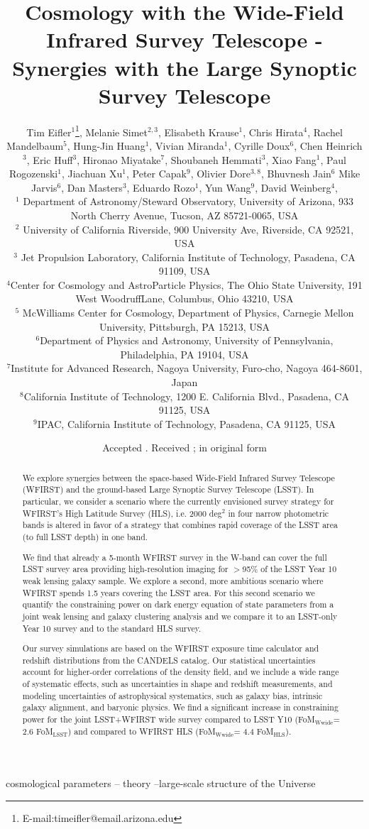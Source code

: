 \documentclass[fleqn,usenatbib,useAMS]{mnras}
\title[Cosmology with WFIRST - Synergies with LSST]{Cosmology with the Wide-Field Infrared Survey Telescope - Synergies with the Large Synoptic Survey Telescope}
\author[Tim Eifler et al.]{Tim Eifler$^{1}$\thanks{E-mail:timeifler@email.arizona.edu}, 
Melanie Simet$^{2,3}$,
Elisabeth Krause$^{1}$,
Chris Hirata$^{4}$, 
Rachel Mandelbaum$^{5}$, 
\newauthor
Hung-Jin Huang$^{1}$,
Vivian Miranda$^{1}$,
Cyrille Doux$^{6}$,
Chen Heinrich$^{3}$,
Eric Huff$^{3}$,
\newauthor
Hironao Miyatake$^{7}$,
Shoubaneh Hemmati$^{3}$, 
Xiao Fang$^{1}$,
Paul Rogozenski$^{1}$, 
Jiachuan Xu$^{1}$, 
\newauthor 
Peter Capak$^{9}$,
Olivier Dore$^{3,8}$,
Bhuvnesh Jain$^{6}$
Mike Jarvis$^{6}$,
Dan Masters$^{3}$, 
\newauthor
Eduardo Rozo$^{1}$, 
Yun Wang$^{9}$,
David Weinberg$^{4}$, 
\\
$^{1}$ Department of Astronomy/Steward Observatory, University of Arizona, 933 North Cherry Avenue, Tucson, AZ 85721-0065, USA \\
$^{2}$ University of California Riverside, 900 University Ave, Riverside, CA 92521, USA \\
$^{3}$ Jet Propulsion Laboratory, California Institute of Technology, Pasadena, CA 91109, USA\\
$^{4}$Center for Cosmology and AstroParticle Physics, The Ohio State University, 191 West WoodruffLane, Columbus, Ohio 43210, USA\\
$^{5}$ McWilliams Center for Cosmology, Department of Physics, Carnegie Mellon University, Pittsburgh, PA 15213, USA \\
$^{6}$Department of Physics and Astronomy, University of Pennsylvania, Philadelphia, PA 19104, USA \\
$^{7}$Institute for Advanced Research, Nagoya University, Furo-cho, Nagoya 464-8601, Japan \\
$^{8}$California Institute of Technology, 1200 E. California Blvd., Pasadena, CA 91125, USA\\
$^{9}$IPAC, California Institute of Technology, Pasadena, CA 91125, USA
}
\newcommand{\mr}{\mathrm}
\begin{document}
\date{Accepted . Received ; in original form }

\pagerange{\pageref{firstpage}--\pageref{lastpage}} 

\maketitle

\label{firstpage}

\begin{abstract} 
We explore synergies between the space-based Wide-Field Infrared Survey Telescope (WFIRST) and the ground-based Large Synoptic Survey Telescope (LSST). In particular, we consider a scenario where the currently envisioned survey strategy for WFIRST's High Latitude Survey (HLS), i.e. 2000 deg$^2$ in four narrow photometric bands is altered in favor of a strategy that combines rapid coverage of the LSST area (to full LSST depth) in one band. 

We find that already a 5-month WFIRST survey in the W-band can cover the full LSST survey area providing high-resolution imaging for $>$95\% of the LSST Year 10 weak lensing galaxy sample. We explore a second, more ambitious scenario where WFIRST spends 1.5 years covering the LSST area. For this second scenario we quantify the constraining power on dark energy equation of state parameters from a joint weak lensing and galaxy clustering analysis and we compare it to an LSST-only Year 10 survey and to the standard HLS survey. 

Our survey simulations are based on the WFIRST exposure time calculator and redshift distributions from the CANDELS catalog. Our statistical uncertainties account for higher-order correlations of the density field, and we include a wide range of systematic effects, such as uncertainties in shape and redshift measurements, and modeling uncertainties of astrophysical systematics, such as galaxy bias, intrinsic galaxy alignment, and baryonic physics. We find a significant increase in constraining power for the joint LSST+WFIRST wide survey compared to LSST Y10 (FoM$_\mr{Wwide}$= 2.6 FoM$_\mr{LSST}$) and compared to WFIRST HLS (FoM$_\mr{Wwide}$= 4.4 FoM$_\mr{HLS}$). 
\end{abstract}


\begin{keywords}
cosmological parameters -- theory --large-scale structure of the Universe
\end{keywords}

\renewcommand{\thefootnote}{\arabic{footnote}}
\setcounter{footnote}{0}
\end{document}
